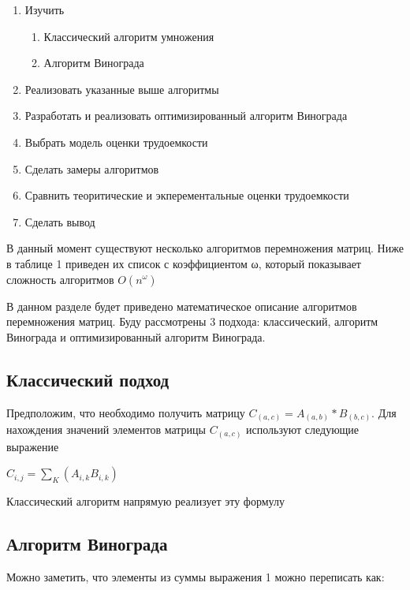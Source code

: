 \documentclass[a4paper, 14pt]{article}
\begin{document}
	\begin{enumerate}
		\item Изучить
		\begin{enumerate}
			\item Классический алгоритм умножения
			\item Алгоритм Винограда
		\end{enumerate}
		\item Реализовать указанные выше алгоритмы
		\item Разработать и реализовать оптимизированный алгоритм Винограда
		\item Выбрать модель оценки трудоемкости
		\item Сделать замеры алгоритмов
		\item Сравнить теоритические и экперементальные оценки трудоемкости 
		\item Сделать вывод
	\end{enumerate}
	
	В данный момент существуют несколько алгоритмов перемножения матриц. Ниже в таблице 1 приведен их список с коэффициентом ω, который показывает сложность алгоритмов $O(n^\omega)$
		
	В данном разделе будет приведено математическое описание алгоритмов перемножения матриц. Буду рассмотрены 3 подхода: классический, алгоритм Винограда и оптимизированный алгоритм Винограда.
	
	\subsection{Классический подход}
	
	Предположим, что необходимо получить матрицу $C_{(a,c)} = A_{(a,b)} * B_{(b,c)}$. Для нахождения значений элементов матрицы $C_{(a,c)}$ используют следующие выражение
	
	\begin{center}
		\begin{math}
		C_{i,j} = \sum_{K}(A_{i, k}B_{i,k})
		\end{math}
	\end{center}
		
	Классический алгоритм напрямую реализует эту формулу

	\subsection{Алгоритм Винограда}
	
	Можно заметить, что элементы из суммы выражения 1 можно переписать как:
	
\end{document}
